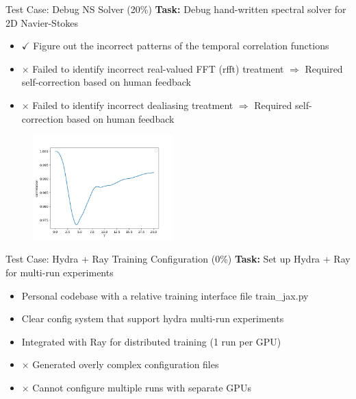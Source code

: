\documentclass[aspectratio=169]{beamer}
\begin{document}
\begin{frame}{Test Case: Debug NS Solver (20\%)}
	\textbf{Task:} Debug hand-written spectral solver for 2D Navier-Stokes
	\begin{itemize}
		\item $\checkmark$ Figure out the incorrect patterns of the temporal
		correlation functions
		\item {\color{red}$\times$} Failed to identify incorrect real-valued FFT (rfft) treatment
		$\Longrightarrow$ Required self-correction based on human feedback
		\item {\color{red}$\times$} Failed to identify incorrect dealiasing treatment
		$\Longrightarrow$ Required self-correction based on human feedback
	\end{itemize}
	\begin{figure}
		\includegraphics[width=0.48\textwidth]{fig/ns.png}
	\end{figure}
\end{frame}

\begin{frame}{Test Case: Hydra + Ray Training Configuration (0\%)}
	\textbf{Task:} Set up Hydra + Ray for multi-run experiments
	\begin{itemize}
		\item Personal codebase with a relative training interface file train\_jax.py
		\item Clear config system that support hydra multi-run experiments
		\item Integrated with Ray for distributed training (1 run per GPU)
		\item {\color{red}$\times$} Generated overly complex configuration files
		\item {\color{red}$\times$} Cannot configure multiple runs with separate GPUs
	\end{itemize}
\end{frame}
\end{document}
